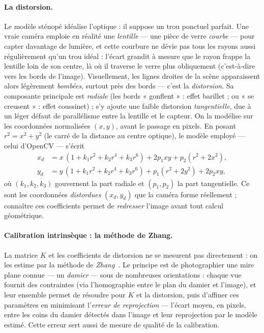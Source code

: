 \paragraph{La distorsion.} Le modèle sténopé idéalise l'optique : il suppose un trou ponctuel parfait. Une vraie caméra emploie en réalité une \emph{lentille} --- une pièce de verre \emph{courbe} --- pour capter davantage de lumière, et cette courbure ne dévie pas tous les rayons aussi régulièrement qu'un trou idéal : l'écart grandit à mesure que le rayon frappe la lentille loin de son centre, là où il traverse le verre plus obliquement (c'est-à-dire vers les bords de l'image). Visuellement, les lignes droites de la scène apparaissent alors légèrement \emph{bombées}, surtout près des bords --- c'est la \emph{distorsion}. Sa composante principale est \emph{radiale} (les bords « gonflent » : effet barillet ; ou « se creusent » : effet coussinet) ; s'y ajoute une faible distorsion \emph{tangentielle}, due à un léger défaut de parallélisme entre la lentille et le capteur. On la modélise sur les coordonnées normalisées $(x,y)$, avant le passage en pixels. En posant $r^2 = x^2 + y^2$ (le carré de la distance au centre optique), le modèle employé --- celui d'OpenCV --- s'écrit
\[
\begin{aligned}
  x_d &= x\,(1 + k_1 r^2 + k_2 r^4 + k_3 r^6) + 2 p_1 x y + p_2 (r^2 + 2x^2),\\
  y_d &= y\,(1 + k_1 r^2 + k_2 r^4 + k_3 r^6) + p_1 (r^2 + 2y^2) + 2 p_2 x y,
\end{aligned}
\]
où $(k_1, k_2, k_3)$ gouvernent la part radiale et $(p_1, p_2)$ la part tangentielle. Ce sont les coordonnées \emph{distordues} $(x_d, y_d)$ que la caméra forme réellement ; connaître ces coefficients permet de \emph{redresser} l'image avant tout calcul géométrique.

\paragraph{Calibration intrinsèque : la méthode de Zhang.} La matrice $K$ et les coefficients de distorsion ne se mesurent pas directement : on les estime par la méthode de \emph{Zhang}~\cite{zhang_flexible_2000}. Le principe est de photographier une mire plane connue --- un \emph{damier} --- sous de nombreuses orientations : chaque vue fournit des contraintes (via l'homographie entre le plan du damier et l'image), et leur ensemble permet de résoudre pour $K$ et la distorsion, puis d'affiner ces paramètres en minimisant l'\emph{erreur de reprojection} --- l'écart moyen, en pixels, entre les coins du damier détectés dans l'image et leur reprojection par le modèle estimé. Cette erreur sert aussi de mesure de qualité de la calibration.

